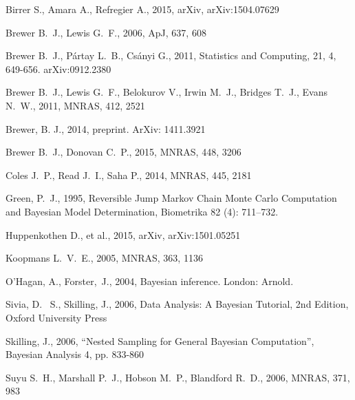 \documentclass[useAMS,usenatbib]{mn2e}
\begin{document}
\begin{thebibliography}{99}
 Birrer S., Amara A., Refregier A., 2015, arXiv, arXiv:1504.07629

 Brewer B.~J., Lewis G.~F., 2006, ApJ, 637, 608

 Brewer B.~J., P{\'a}rtay L.~B., Cs{\'a}nyi G., 2011,
Statistics and Computing, 21, 4, 649-656. arXiv:0912.2380

Brewer B.~J., Lewis G.~F., Belokurov V., Irwin M.~J., Bridges T.~J., Evans 
N.~W., 2011, MNRAS, 412, 2521

 Brewer, B. J., 2014,
preprint. ArXiv: 1411.3921

 Brewer B.~J., Donovan C.~P., 2015, MNRAS, 448, 3206 

 Coles J.~P., Read J.~I., Saha P., 2014, MNRAS, 445, 2181

Green, P.~J., 1995, Reversible Jump Markov Chain Monte Carlo Computation and Bayesian Model Determination, Biometrika 82 (4): 711–732.

 Huppenkothen D., et al., 2015, arXiv, 
arXiv:1501.05251 

Koopmans L.~V.~E., 2005, MNRAS, 363, 1136

O'Hagan, A., Forster,~J., 2004, Bayesian inference. London: Arnold.

 Sivia, 
D.~ S., Skilling, J., 2006, Data Analysis: A Bayesian Tutorial, 2nd 
Edition, Oxford University Press

 Skilling, 
J., 2006, ``Nested Sampling for General Bayesian Computation'', Bayesian 
Analysis 4, pp. 833-860

Suyu S.~H., Marshall P.~J., Hobson M.~P., Blandford R.~D., 2006, MNRAS, 
371, 983


\end{thebibliography}
\end{document}
